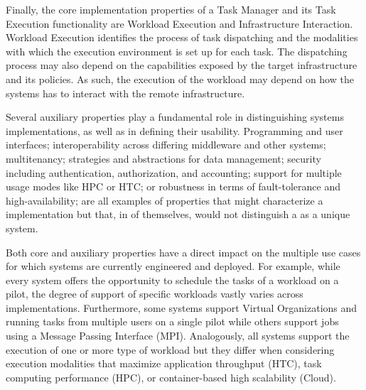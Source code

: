 \documentclass{sig-alternate}
\begin{document}

Finally, the core implementation properties of a Task Manager and its Task
Execution functionality are Workload Execution and Infrastructure Interaction.
Workload Execution identifies the process of task dispatching and the modalities
with which the execution environment is set up for each task. The dispatching
process may also depend on the capabilities exposed by the target infrastructure
and its policies. As such, the execution of the workload may depend on how the
\pilot systems has to interact with the remote infrastructure.


Several auxiliary properties play a fundamental role in distinguishing \pilot
systems implementations, as well as in defining their usability. Programming and
user interfaces; interoperability across differing middleware and other \pilot
systems; multitenancy; strategies and abstractions for data management; security
including authentication, authorization, and accounting; support for multiple
usage modes like HPC or HTC; or robustness in terms of fault-tolerance and
high-availability; are all examples of properties that might characterize a
\pilot implementation but that, in of themselves, would not distinguish a \pilot
as a unique system.

Both core and auxiliary properties have a direct impact on the multiple use
cases for which \pilot systems are currently engineered and deployed. For
example, while every \pilot system offers the opportunity to schedule the tasks
of a workload on a pilot, the degree of support of specific workloads vastly
varies across implementations. Furthermore, some \pilot systems support Virtual
Organizations and running tasks from multiple users on a single pilot while
others support jobs using a Message Passing Interface (MPI). Analogously, all
\pilot systems support the execution of one or more type of workload but they
differ when considering execution modalities that maximize application
throughput (HTC), task computing performance (HPC), or container-based high
scalability (Cloud).
\end{document}
